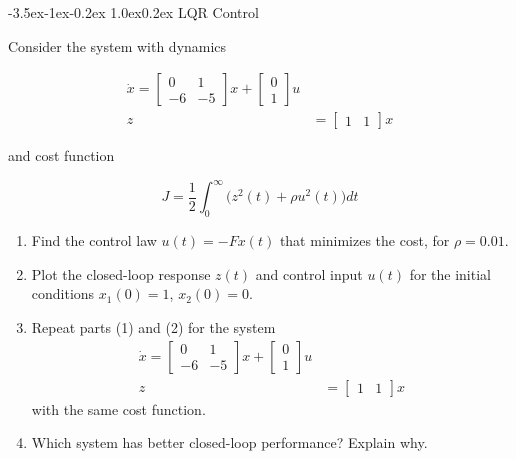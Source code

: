 \documentclass[11pt,letterpaper,onecolumn,notitlepage]{article}
\makeatletter
\renewcommand\section{\@startsection{section}{1}{\z@}%
{-3.5ex\@plus-1ex\@minus-0.2ex}%
{1.0ex\@plus0.2ex}%
{\fontsize{12pt}{12pt}\selectfont\bfseries\sffamily}}
\makeatother
\begin{document}
  \clearpage
  \section{LQR Control}

  Consider the system with dynamics

  \begin{align*}
    \dot{x}=
    \begin{bmatrix}
      0 & 1 \\
      -6 & -5
    \end{bmatrix}
    x+
    \begin{bmatrix}
      0 \\
      1
    \end{bmatrix}
    u \\
    z&=
    \begin{bmatrix}
      1 & 1
    \end{bmatrix}x
  \end{align*}

  and cost function

  \begin{equation*}
    J=\frac{1}{2}\int_{0}^{\infty}\bigr(z^{2}(t)+\rho u^{2}(t)\bigr)dt
  \end{equation*}

  \begin{enumerate}
    \item{Find the control law $u(t)=-Fx(t)$ that minimizes the cost, for $\rho=0.01$.}
    \item{Plot the closed-loop response $z(t)$ and control input $u(t)$ for the initial conditions $x_{1}(0)=1$, $x_{2}(0)=0$.}
    \item{Repeat parts (1) and (2) for the system}
    \begin{align*}
      \dot{x}=
      \begin{bmatrix}
        0 & 1 \\
        -6 & -5
      \end{bmatrix}
      x+
      \begin{bmatrix}
        0 \\
        1
      \end{bmatrix}
      u \\
      z&=
      \begin{bmatrix}
        1 & 1
      \end{bmatrix}x
    \end{align*}
    with the same cost function.
    \item{Which system has better closed-loop performance? Explain why.}
  \end{enumerate}
\end{document}

